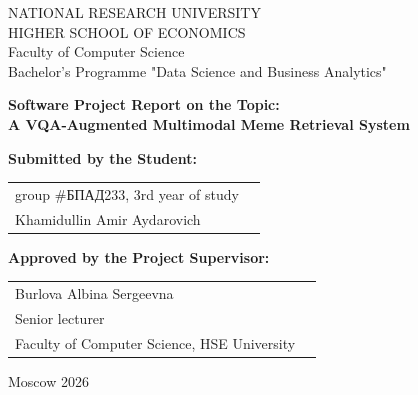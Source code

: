 \begin{titlepage}
\newpage
{
\begin{center}
NATIONAL RESEARCH UNIVERSITY\\
HIGHER SCHOOL OF ECONOMICS
\\
\bigskip
Faculty of Computer Science\\
Bachelor's Programme "Data Science and Business Analytics"
\end{center}
}
\vspace{4em}
\begin{center}
{\bf Software Project Report on the Topic:}\\
{\bf A VQA-Augmented Multimodal Meme Retrieval System}\\
\end{center}

\vspace{6em}
{\bf Submitted by the Student: \vspace{2mm}}

{
\begin{tabular}{l@{\hskip 1.5cm}l}
group \#\foreignlanguage{russian}{БПАД}233, 3rd year of study \\
Khamidullin Amir Aydarovich \\
\end{tabular}}

\vspace{1em}
{\bf Approved by the Project Supervisor: \vspace{2mm}}

{
\begin{tabular}{l@{\hskip 1.5cm}l}
Burlova Albina Sergeevna\\
Senior lecturer\\
Faculty of Computer Science, HSE University 
\end{tabular}}

\vspace{\fill}
\begin{center}
Moscow 2026
\end{center}
\end{titlepage}
